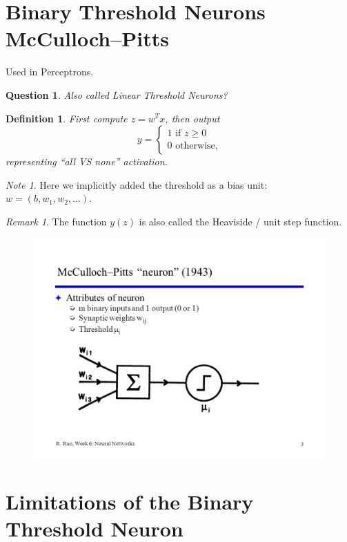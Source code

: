 \documentclass[12pt]{article}
\theoremstyle{plain}
\newtheorem{question}[theorem]{Question}
\newtheorem{definition}[theorem]{Definition}
\theoremstyle{definition}
\theoremstyle{remark}
\newtheorem{remark}[theorem]{Remark}
\newtheorem{note}[theorem]{Note}
\begin{document}
\section{Binary Threshold Neurons McCulloch–Pitts}

Used in Perceptrons.

\begin{question}
Also called Linear Threshold Neurons?
\end{question}

\begin{definition}
First compute $z = w^T x$, then output $$y = \begin{cases}
1 \text{ if } z \geq 0 \\
0 \text{ otherwise,}
\end{cases}$$ representing ``all VS none'' activation.
\end{definition}

\begin{note}
Here we implicitly added the threshold as a bias unit: $w = (b, w_1, w_2, \ldots)$.
\end{note}

\begin{remark}
The function $y(z)$ is also called the Heaviside / unit step function.
\end{remark}

\begin{figure}[H]
\centering
\includegraphics[width=1.0\textwidth]{mccullochpitts}
\end{figure}

\section{Limitations of the Binary Threshold Neuron}
\end{document}

